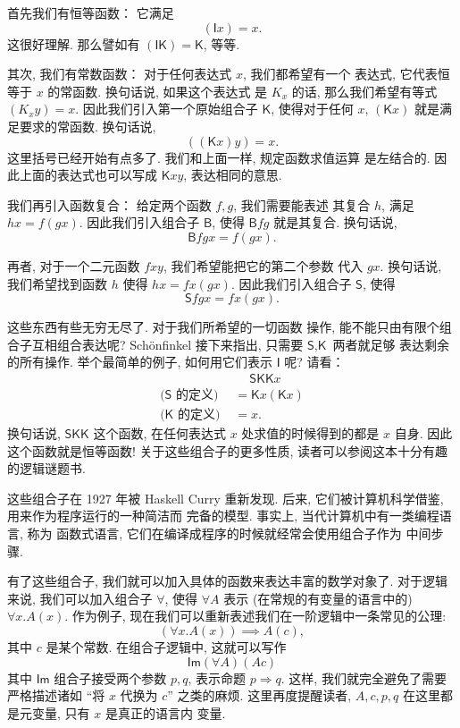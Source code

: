 \documentclass[UTF8]{ctexbook}
\newcommand{\cons}[1]{\textsf{#1}}
\theoremstyle{plain}
\theoremstyle{definition}
\theoremstyle{remark}
\begin{document}
首先我们有恒等函数： 它满足
\[(\cons{I}x) = x.\]
这很好理解. 那么譬如有 \((\cons{I}\cons{K}) = \cons{K}\),
等等.

其次, 我们有常数函数： 对于任何表达式 \(x\), 我们都希望有一个
表达式, 它代表恒等于 \(x\) 的常函数. 换句话说, 如果这个表达式
是 \(K_x\) 的话, 那么我们希望有等式
\((K_xy) = x\).
因此我们引入第一个原始组合子 \(\cons{K}\), 使得对于任何
\(x\), \((\cons{K}x)\) 就是满足要求的常函数. 换句话说,
\[((\cons{K}x)y) = x.\]
这里括号已经开始有点多了. 我们和上面一样, 规定函数求值运算
是左结合的. 因此上面的表达式也可以写成 \(\cons{K}xy\),
表达相同的意思.

我们再引入函数复合： 给定两个函数 \(f, g\), 我们需要能表述
其复合 \(h\), 满足 \(hx = f(gx)\). 因此我们引入组合子 \(\cons{B}\),
使得 \(\cons{B}fg\) 就是其复合. 换句话说,
\[\cons{B}fgx = f(gx).\]

再者, 对于一个二元函数 \(fxy\), 我们希望能把它的第二个参数
代入 \(gx\). 换句话说, 我们希望找到函数 \(h\)
使得 \(hx = fx(gx)\). 因此我们引入组合子 \(\cons{S}\),
使得 \[\cons{S}fgx = fx(gx).\]

这些东西有些无穷无尽了. 对于我们所希望的一切函数
操作, 能不能只由有限个组合子互相组合表达呢? Sch\"onfinkel
接下来指出, 只需要 \(\cons{S}, \cons{K}\) 两者就足够
表达剩余的所有操作. 举个最简单的例子, 如何用它们表示 \(\cons{I}\)
呢? 请看：
\[\begin{aligned}
  &\quad~\cons{S}\cons{K}\cons{K}x\\
\text{(\(\cons{S}\) 的定义) }&= \cons{K}x(\cons{K}x)\\
\text{(\(\cons{K}\) 的定义) }&= x.
\end{aligned}\]
换句话说, \(\cons{S}\cons{K}\cons{K}\) 这个函数,
在任何表达式 \(x\) 处求值的时候得到的都是 \(x\) 自身.
因此这个函数就是恒等函数! 关于这些组合子的更多性质,
读者可以参阅这本十分有趣的逻辑谜题书\cite{schonfinkel:1924:combinator}.

这些组合子在 1927 年被 Haskell Curry 重新发现.
后来, 它们被计算机科学借鉴, 用来作为程序运行的一种简洁而
完备的模型. 事实上, 当代计算机中有一类编程语言, 称为
函数式语言, 它们在编译成程序的时候就经常会使用组合子作为
中间步骤.

有了这些组合子, 我们就可以加入具体的函数来表达丰富的数学对象了.
对于逻辑来说, 我们可以加入组合子 \(\forall\), 使得
\(\forall A\) 表示 (在常规的有变量的语言中的) \(\forall x. A(x)\).
作为例子, 现在我们可以重新表述我们在一阶逻辑中一条常见的公理:
\[(\forall x. A(x)) \implies A(c),\]
其中 \(c\) 是某个常数. 在组合子逻辑中, 这就可以写作
\[\cons{Im}(\forall A)(A c)\]
其中 \(\cons{Im}\) 组合子接受两个参数 \(p, q\), 表示命题
\(p \Rightarrow q\). 这样, 我们就完全避免了需要严格描述诸如
“将 \(x\) 代换为 \(c\)” 之类的麻烦. 这里再度提醒读者,
\(A, c, p, q\) 在这里都是元变量, 只有 \(x\) 是真正的语言内
变量.
\end{document}
